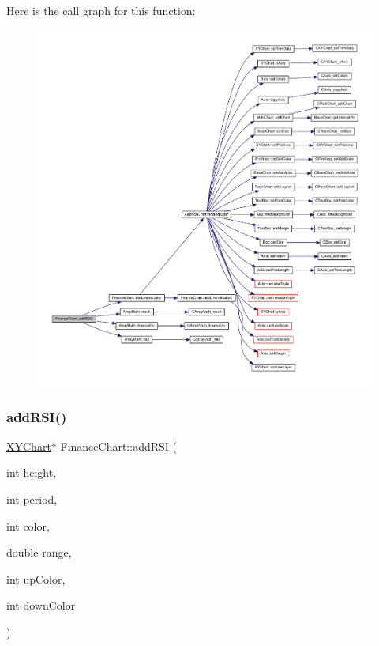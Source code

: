 Here is the call graph for this function\+:
\nopagebreak
\begin{figure}[H]
\begin{center}
\leavevmode
\includegraphics[width=350pt]{class_finance_chart_ac8ca50e0764d729d0591d1baace193de_cgraph}
\end{center}
\end{figure}
\mbox{\label{class_finance_chart_aba175ac4bc80577bad0767bcd75109c7}} 
\subsubsection{\texorpdfstring{add\+R\+S\+I()}{addRSI()}}
{\footnotesize\ttfamily \hyperlink{class_x_y_chart}{X\+Y\+Chart}$\ast$ Finance\+Chart\+::add\+R\+SI (\begin{DoxyParamCaption}\item[{int}]{height,  }\item[{int}]{period,  }\item[{int}]{color,  }\item[{double}]{range,  }\item[{int}]{up\+Color,  }\item[{int}]{down\+Color }\end{DoxyParamCaption})\hspace{0.3cm}{\ttfamily [inline]}}




